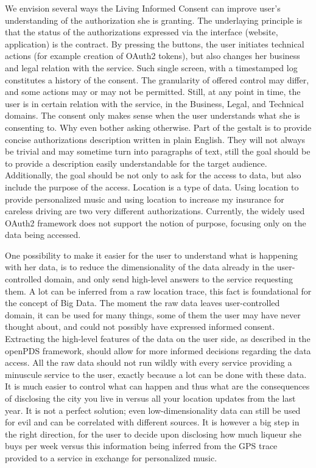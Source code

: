 We envision several ways the Living Informed Consent can improve user's understanding of the authorization she is granting. 
The underlaying principle is that the status of the authorizations expressed via the interface (website, application) is the contract.
By pressing the buttons, the user initiates technical actions (for example creation of OAuth2 tokens), but also changes her business and legal relation with the service.
Such single screen, with a timestamped log constitutes a history of the consent. 
The granularity of offered control may differ, and some actions may or may not be permitted.
Still, at any point in time, the user is in certain relation with the service, in the Business, Legal, and Technical domains. 
The consent only makes sense when the user understands what she is consenting to.
Why even bother asking otherwise.
Part of the gestalt is to provide concise authorizations description written in plain English.
They will not always be trivial and may sometime turn into paragraphs of text, still the goal should be to provide a description easily understandable for the target audience.
Additionally, the goal should be not only to ask for the access to data, but also include the purpose of the access.
Location is a type of data. Using location to provide personalized music and using location to increase my insurance for careless driving are two very different authorizations.
Currently, the widely used OAuth2 framework does not support the notion of purpose, focusing only on the data being accessed.

One possibility to make it easier for the user to understand what is happening with her data, is to reduce the dimensionality of the data already in the user-controlled domain, and only send high-level answers to the service requesting them.
A lot can be inferred from a raw location trace, this fact is foundational for the concept of Big Data.
The moment the raw data leaves user-controlled domain, it can be used for many things, some of them the user may have never thought about, and could not possibly have expressed informed consent.
Extracting the high-level features of the data on the user side, as described in the openPDS framework, should allow for more informed decisions regarding the data access.
All the raw data should not run wildly with every service providing a minuscule service to the user, exactly because a lot can be done with these data.
It is much easier to control what can happen and thus what are the consequences of disclosing the city you live in versus all your location updates from the last year.
It is not a perfect solution; even low-dimensionality data can still be used for evil and can be correlated with different sources.
It is however a big step in the right direction, for the user to decide upon disclosing how much liqueur she buys per week versus this information being inferred from the GPS trace provided to a service in exchange for personalized music. 

